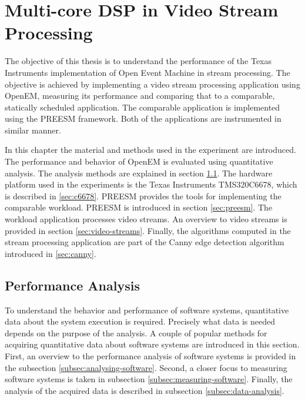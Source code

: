\chapter{Multi-core DSP in Video Stream Processing}
\label{chapter:experiments}
The objective of this thesis is to understand the performance of the Texas Instruments implementation of Open Event Machine in stream processing. The objective is achieved by implementing a video stream processing application using OpenEM, measuring its performance and comparing that to a comparable, statically scheduled application. The comparable application is implemented using the PREESM framework. Both of the applications are instrumented in similar manner.

In this chapter the material and methods used in the experiment are introduced. The performance and behavior of OpenEM is evaluated using quantitative analysis. The analysis methods are explained in section \ref{sec:performance-analysis}. The hardware platform used in the experiments is the Texas Instruments TMS320C6678, which is described in \ref{sec:c6678}. PREESM provides the tools for implementing the comparable workload. PREESM is introduced in section \ref{sec:preesm}. The workload application processes video streams. An overview to video streams is provided in section \ref{sec:video-streams}. Finally, the algorithms computed in the stream processing application are part of the Canny edge detection algorithm introduced in \ref{sec:canny}.

\section{Performance Analysis}
\label{sec:performance-analysis}
To understand the behavior and performance of software systems, quantitative data about the system execution is required. Precisely what data is needed depends on the purpose of the analysis. A couple of popular methods for acquiring quantitative data about software systems are introduced in this section. First, an overview to the performance analysis of software systems is provided in the subsection \ref{subsec:analysing-software}. Second, a closer focus to measuring software systems is taken in subsection \ref{subsec:measuring-software}. Finally, the analysis of the acquired data is described in subsection \ref{subsec:data-analysis}.

